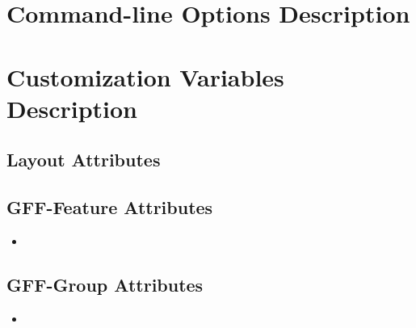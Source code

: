 \documentclass[11pt]{article}
\newcommand{\sctn}[1]{\section{#1}}
\newcommand{\subsctn}[1]{\subsection{#1}}
\def\prog{\textsc{\textbf{gff2aplot}}}
\begin{document}


\newpage

%  

\tableofcontents

\listoffigures

\listoftables


\newpage
{}
\setcounter{page}{1}

%
% 

%
% 

%
% 

%
% 

%
% 

%
% 


\sctn{Command-line Options Description}

\newcommand{\setlist}{
 \setlength{\leftmargin}{0.5cm}
 \setlength{\itemindent}{-0.5cm}
 \setlength{\labelwidth}{0pt}
 \setlength{\labelsep}{0pt}
 \renewcommand{\labelitemi}{}
} %

 \begin{itemize}\setlist
 \end{itemize}

\newpage

\sctn{Customization Variables Description}


\subsctn{Layout Attributes}

 \begin{itemize}\setlist
  
 \end{itemize}

\subsctn{GFF-Feature Attributes}

 \begin{itemize}\setlist
  
  \item 
 \end{itemize}

\subsctn{GFF-Group Attributes}

 \begin{itemize}\setlist
  
  \item 
 \end{itemize}
\end{document}
